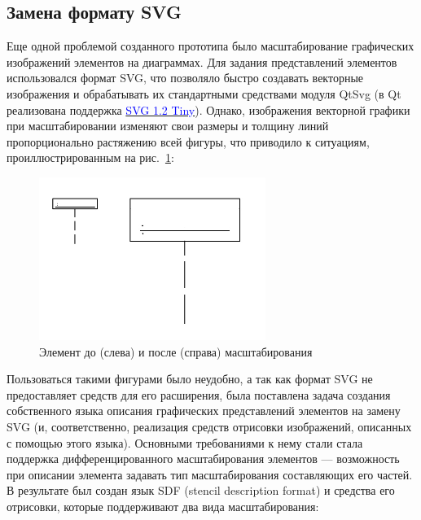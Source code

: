 \documentclass[a5paper]{article}
\newcommand\textstyleInternetlink[1]{\textcolor{blue}{#1}}
\begin{document}
\subsection{Замена формату SVG}

Еще одной проблемой созданного прототипа было масштабирование
графических изображений элементов на диаграммах. Для задания
представлений элементов использовался формат SVG, что позволяло быстро
создавать векторные изображения и обрабатывать их стандартными
средствами модуля QtSvg (в Qt реализована поддержка
\href{http://www.w3.org/TR/SVGMobile12/}{\textstyleInternetlink{SVG 1.2 Tiny}}). 
Однако, изображения векторной графики при масштабировании
изменяют свои размеры и толщину линий пропорционально растяжению всей
фигуры, что приводило к ситуациям, проиллюстрированным на рис.~\ref{scaling}:

\begin{figure} [ht]
  \begin{center}
    \includegraphics[width=7.35cm,height=5.295cm]{draft04-img3.jpg}
    \caption{Элемент до (слева) и после (справа) масштабирования}
    \label{scaling}
  \end{center}
\end{figure}

Пользоваться такими фигурами было неудобно, а так как формат
SVG не предоставляет средств для его
расширения, была поставлена задача создания собственного языка описания
графических представлений элементов на замену SVG (и, соответственно,
реализация средств отрисовки изображений, описанных с помощью этого
языка). Основными требованиями к нему стали стала поддержка
дифференцированного масштабирования элементов --- возможность при
описании элемента задавать тип масштабирования составляющих его частей.
В результате был создан язык SDF (stencil description format) и
средства его отрисовки, которые поддерживают два вида масштабирования:
\end{document}
